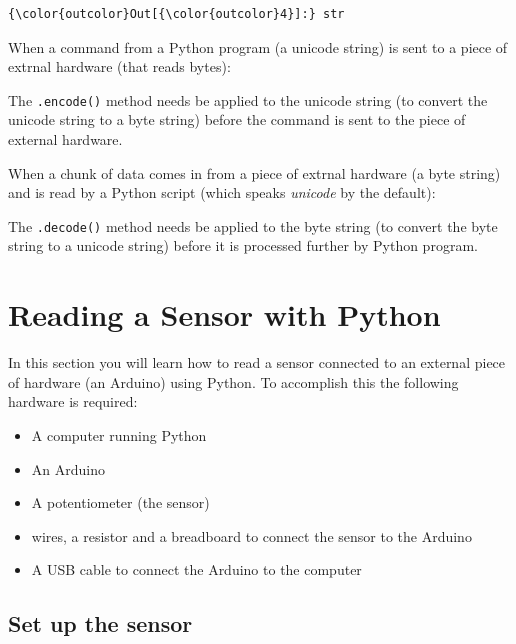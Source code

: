 \documentclass{book}
\providecommand{\tightlist}{%
      \setlength{\itemsep}{0pt}\setlength{\parskip}{0pt}}
\begin{document}
\begin{Verbatim}[commandchars=\\\{\}]
{\color{outcolor}Out[{\color{outcolor}4}]:} str
\end{Verbatim}
            

    
        When a command from a Python program (a unicode string) is sent to a
piece of extrnal hardware (that reads bytes):

The \lstinline!.encode()! method needs be applied to the unicode string
(to convert the unicode string to a byte string) before the command is
sent to the piece of external hardware.

When a chunk of data comes in from a piece of extrnal hardware (a byte
string) and is read by a Python script (which speaks \emph{unicode} by
the default):

The \lstinline!.decode()! method needs be applied to the byte string (to
convert the byte string to a unicode string) before it is processed
further by Python program.
    




    
        \section{Reading a Sensor with
Python}\label{reading-a-sensor-with-python}
    




    
        In this section you will learn how to read a sensor connected to an
external piece of hardware (an Arduino) using Python. To accomplish this
the following hardware is required:

\begin{itemize}
\tightlist
\item
  A computer running Python
\item
  An Arduino
\item
  A potentiometer (the sensor)
\item
  wires, a resistor and a breadboard to connect the sensor to the
  Arduino
\item
  A USB cable to connect the Arduino to the computer
\end{itemize}
    




    
        \subsection{Set up the sensor}\label{set-up-the-sensor}
    
\end{document}
